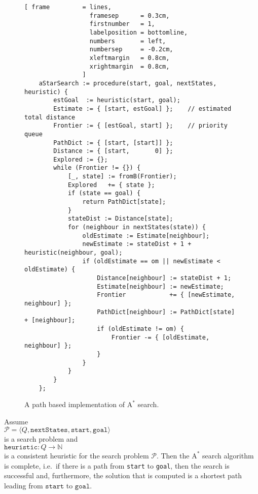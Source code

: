 \begin{figure}[!ht]
\centering
\begin{Verbatim}[ frame         = lines, 
                  framesep      = 0.3cm, 
                  firstnumber   = 1,
                  labelposition = bottomline,
                  numbers       = left,
                  numbersep     = -0.2cm,
                  xleftmargin   = 0.8cm,
                  xrightmargin  = 0.8cm,
                ]
    aStarSearch := procedure(start, goal, nextStates, heuristic) {
        estGoal  := heuristic(start, goal);
        Estimate := { [start, estGoal] };    // estimated total distance
        Frontier := { [estGoal, start] };    // priority queue
        PathDict := { [start, [start]] };
        Distance := { [start,       0] };
        Explored := {};
        while (Frontier != {}) {
            [_, state] := fromB(Frontier);
            Explored   += { state };
            if (state == goal) {
                return PathDict[state];
            }
            stateDist := Distance[state];
            for (neighbour in nextStates(state)) {
                oldEstimate := Estimate[neighbour];
                newEstimate := stateDist + 1 + heuristic(neighbour, goal);
                if (oldEstimate == om || newEstimate < oldEstimate) {
                    Distance[neighbour] := stateDist + 1;
                    Estimate[neighbour] := newEstimate;
                    Frontier            += { [newEstimate, neighbour] };
                    PathDict[neighbour] := PathDict[state] + [neighbour];
                    if (oldEstimate != om) {
                        Frontier -= { [oldEstimate, neighbour] };
                    }
                }
            }
        }
    };
\end{Verbatim}
\vspace*{-0.3cm}
\caption{A path based implementation of $\textrm{A}^*$ search.}
\label{fig:a-star-search-path.stlx}
\end{figure}



\begin{Theorem} 
Assume 
\\[0.2cm]
\hspace*{1.3cm}
$\mathcal{P} = \langle Q,\mathtt{nextStates}, \mathtt{start}, \mathtt{goal}\rangle$
\\[0.2cm]
is a search problem and
\\[0.2cm]
\hspace*{1.3cm}
 $\texttt{heuristic}: Q \rightarrow \mathbb{N}$
\\[0.2cm]
is a consistent heuristic for the search problem $\mathcal{P}$.   Then the
$\mathrm{A}^*$ search algorithm is complete, i.e.~if there is a path from \texttt{start} to \texttt{goal}, then
the search is successful and, furthermore, the solution that is computed is a shortest path
leading from $\texttt{start}$ to $\texttt{goal}$.    
\end{Theorem}

